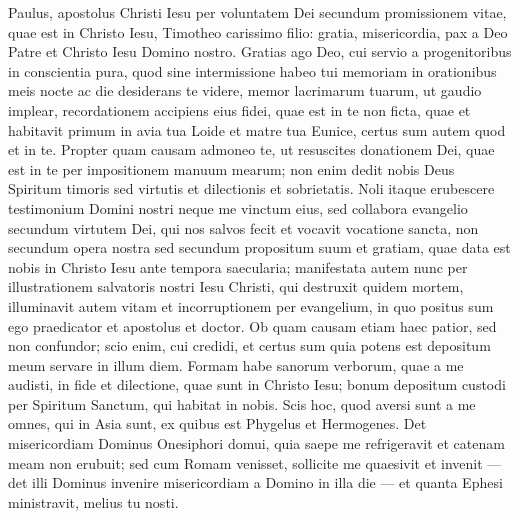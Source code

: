 \begin{biblechapter}
 \verse Paulus, apostolus Christi Iesu per voluntatem Dei secundum promissionem vitae, quae est in Christo Iesu, 
\verse Timotheo carissimo filio: gratia, misericordia, pax a Deo Patre et Christo Iesu Domino nostro.
 \verse Gratias ago Deo, cui servio a progenitoribus in conscientia pura, quod sine intermissione habeo tui memoriam in orationibus meis nocte ac die 
\verse desiderans te videre, memor lacrimarum tuarum, ut gaudio implear, 
\verse recordationem accipiens eius fidei, quae est in te non ficta, quae et habitavit primum in avia tua Loide et matre tua Eunice, certus sum autem quod et in te.
 \verse Propter quam causam admoneo te, ut resuscites donationem Dei, quae est in te per impositionem manuum mearum; 
\verse non enim dedit nobis Deus Spiritum timoris sed virtutis et dilectionis et sobrietatis. 
\verse Noli itaque erubescere testimonium Domini nostri neque me vinctum eius, sed collabora evangelio secundum virtutem Dei, 
\verse qui nos salvos fecit et vocavit vocatione sancta, non secundum opera nostra sed secundum propositum suum et gratiam, quae data est nobis in Christo Iesu ante tempora saecularia; 
\verse manifestata autem nunc per illustrationem salvatoris nostri Iesu Christi, qui destruxit quidem mortem, illuminavit autem vitam et incorruptionem per evangelium, 
\verse in quo positus sum ego praedicator et apostolus et doctor.
 \verse Ob quam causam etiam haec patior, sed non confundor; scio enim, cui credidi, et certus sum quia potens est depositum meum servare in illum diem. 
\verse Formam habe sanorum verborum, quae a me audisti, in fide et dilectione, quae sunt in Christo Iesu; 
\verse bonum depositum custodi per Spiritum Sanctum, qui habitat in nobis.
 \verse Scis hoc, quod aversi sunt a me omnes, qui in Asia sunt, ex quibus est Phygelus et Hermogenes. 
\verse Det misericordiam Dominus Onesiphori domui, quia saepe me refrigeravit et catenam meam non erubuit; 
\verse sed cum Romam venisset, sollicite me quaesivit et invenit 
\verse — det illi Dominus invenire misericordiam a Domino in illa die — et quanta Ephesi ministravit, melius tu nosti.
 

\end{biblechapter}
